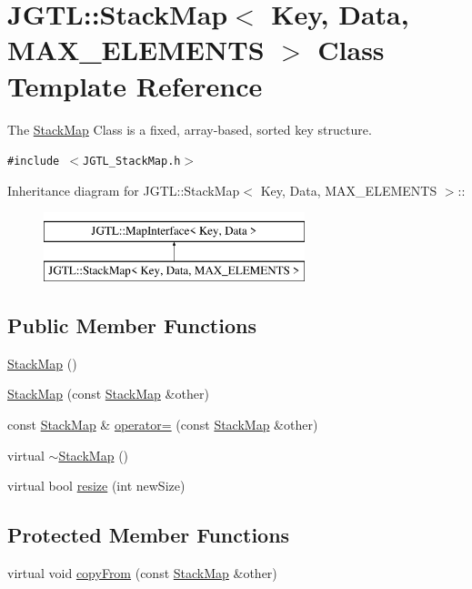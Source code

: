 \hypertarget{class_j_g_t_l_1_1_stack_map}{
\section{JGTL::Stack\-Map$<$ Key, Data, MAX\_\-ELEMENTS $>$ Class Template Reference}
\label{class_j_g_t_l_1_1_stack_map}
}
The \hyperlink{class_j_g_t_l_1_1_stack_map}{Stack\-Map} Class is a fixed, array-based, sorted key structure.  


{\tt \#include $<$JGTL\_\-Stack\-Map.h$>$}

Inheritance diagram for JGTL::Stack\-Map$<$ Key, Data, MAX\_\-ELEMENTS $>$::\begin{figure}[H]
\begin{center}
\leavevmode
\includegraphics[height=2cm]{class_j_g_t_l_1_1_stack_map}
\end{center}
\end{figure}
\subsection*{Public Member Functions}
\begin{CompactItemize}
\item 
\hyperlink{class_j_g_t_l_1_1_stack_map_e6cb52e89d332a1438fa0b807081c46a}{Stack\-Map} ()
\item 
\hyperlink{class_j_g_t_l_1_1_stack_map_a51a9f733e87c5da70660b73e8cf9651}{Stack\-Map} (const \hyperlink{class_j_g_t_l_1_1_stack_map}{Stack\-Map} \&other)
\item 
const \hyperlink{class_j_g_t_l_1_1_stack_map}{Stack\-Map} \& \hyperlink{class_j_g_t_l_1_1_stack_map_5e2b185fcda84ac8a692bd57159d97e9}{operator=} (const \hyperlink{class_j_g_t_l_1_1_stack_map}{Stack\-Map} \&other)
\item 
virtual \hyperlink{class_j_g_t_l_1_1_stack_map_e1648b2a04c3b9d57cb2377bcc8f94a8}{$\sim$Stack\-Map} ()
\item 
virtual bool \hyperlink{class_j_g_t_l_1_1_stack_map_cd9363efffeb00f6b48b21ed2685ac7c}{resize} (int new\-Size)
\end{CompactItemize}
\subsection*{Protected Member Functions}
\begin{CompactItemize}
\item 
virtual void \hyperlink{class_j_g_t_l_1_1_stack_map_3475bde07f081d0c7bbf821703c6f099}{copy\-From} (const \hyperlink{class_j_g_t_l_1_1_stack_map}{Stack\-Map} \&other)
\end{CompactItemize}
